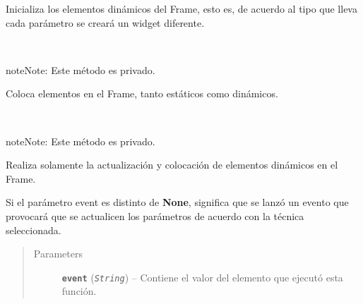 \documentclass[letterpaper,10pt,english]{sphinxmanual}
\begin{document}
\begin{fulllineitems}
\begin{fulllineitems}
Inicializa los elementos dinámicos del Frame, esto es, de acuerdo al tipo 
que lleva cada parámetro se creará un widget diferente.

\end{fulllineitems}


\begin{fulllineitems}
\label{View/Main/MOEA/SharingFunctionFrame:View.Main.MOEA.SharingFunctionFrame.SharingFunctionFrame._SharingFunctionFrame__grid_widgets}~
\begin{notice}{note}{Note:}
Este método es privado.
\end{notice}

Coloca elementos en el Frame, tanto estáticos como dinámicos.

\end{fulllineitems}


\begin{fulllineitems}
\label{View/Main/MOEA/SharingFunctionFrame:View.Main.MOEA.SharingFunctionFrame.SharingFunctionFrame._SharingFunctionFrame__update_widgets}~
\begin{notice}{note}{Note:}
Este método es privado.
\end{notice}

\begin{DUlineblock}{0em}
\item[] Realiza solamente la actualización y colocación de elementos dinámicos 
en el Frame.
\item[] Si el parámetro event es distinto de \textbf{None}, significa que se lanzó 
un evento que provocará que se actualicen los parámetros de acuerdo con
la técnica seleccionada.
\end{DUlineblock}
\begin{quote}\begin{description}
\item[{Parameters}] \leavevmode
\textbf{\texttt{event}} (\emph{\texttt{String}}) -- Contiene el valor del elemento que ejecutó esta función.

\end{description}\end{quote}


\end{fulllineitems}
\end{fulllineitems}
\end{document}
